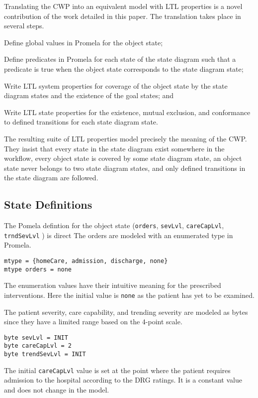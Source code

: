 Translating the CWP into an equivalent model with LTL properties is a novel contribution of the work detailed in this paper. The translation takes place in several steps.
\begin{compactenum}
  \item Define global values in Promela for the object state;
  \item Define predicates in Promela for each state of the state diagram such that a predicate is true when the object state corresponds to the state diagram state;
  \item Write LTL system properties for coverage of the object state by the state diagram states and the existence of the goal states; and
  \item Write LTL state properties for the existence, mutual exclusion, and conformance to defined transitions for each state diagram state.
\end{compactenum}
The resulting suite of LTL properties model precisely the meaning of the CWP. They insist that every state in the state diagram exist somewhere in the workflow, every object state is covered by some state diagram state, an object state never belongs to two state diagram states, and only defined transitions in the state diagram are followed.

\subsection{State Definitions}
The Pomela defintion for the object state (\texttt{orders}, \texttt{sevLvl}, \texttt{careCapLvl}, \texttt{trndSevLvl} )  is direct The orders are modeled with an enumerated type in Promela.
%
{\small
\begin{lstlisting}[style=myPromela]
mtype = {homeCare, admission, discharge, none}
mtype orders = none
\end{lstlisting}
}
%
\noindent The enumeration values have their intuitive meaning for the prescribed interventions. Here the initial value is \texttt{none} as the patient has yet to be examined.

The patient severity, care capability, and trending severity are modeled as bytes since they have a limited range based on the 4-point scale.
%
{\small
\begin{lstlisting}[style=myPromela]
byte sevLvl = INIT
byte careCapLvl = 2
byte trendSevLvl = INIT
\end{lstlisting}
}
%
\noindent The initial \texttt{careCapLvl} value is set at the point where the patient requires admission to the hospital according to the DRG ratings. It is a constant value and does not change in the model.

